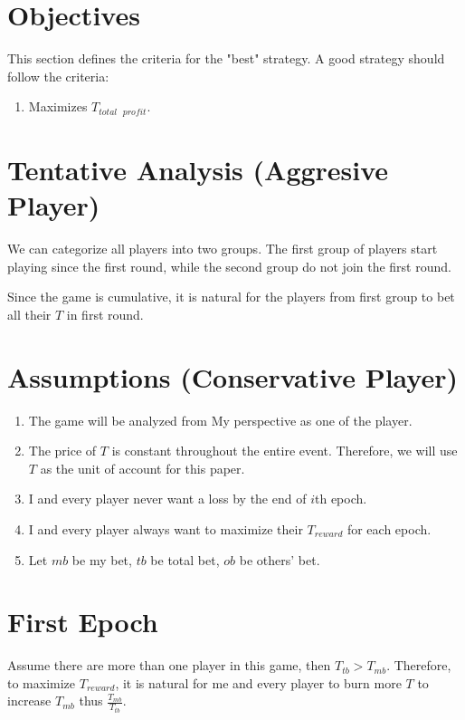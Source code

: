\documentclass{article}
\begin{document}
\section*{Objectives}
This section defines the criteria for the "best" strategy. 
A good strategy should follow the criteria:
\begin{enumerate}
    \item Maximizes $T_{total \text{ }profit}$. 
\end{enumerate}

\section*{Tentative Analysis (Aggresive Player)}
We can categorize all players into two groups.
The first group of players start playing since the first round, while the second group do not join the first round.

Since the game is cumulative, it is natural for the players from first group to bet all their $T$ in first round. 

\section*{Assumptions (Conservative Player)}
\begin{enumerate}
    \item The game will be analyzed from My perspective as one of the player.
    
    \item The price of $T$ is constant throughout the entire event. 
    Therefore, we will use $T$ as the unit of account for this paper.

    \item I and every player never want a loss by the end of $i$th epoch.
    
    \item I and every player always want to maximize their $T_{reward}$ for each epoch.
    
    \item Let $mb$ be my bet, $tb$ be total bet, $ob$ be others' bet.
\end{enumerate}

\section*{First Epoch}
Assume there are more than one player in this game, then $T_{tb} > T_{mb}$. 
Therefore, to maximize $T_{reward}$, it is natural for me and every player to burn more $T$ to increase $T_{mb}$ thus $\frac{T_{mb}}{T_{tb}}$.
\end{document}
